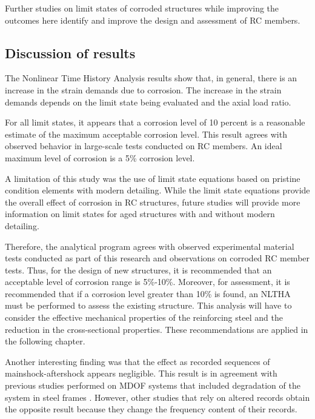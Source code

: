 Further studies on limit states of corroded structures while improving the outcomes here identify and improve the design and assessment of RC members.

\subsection{Discussion of results}

The Nonlinear Time History Analysis results show that, in general, there is an increase in the strain demands due to corrosion. The increase in the strain demands depends on the limit state being evaluated and the axial load ratio. 

For all limit states, it appears that a corrosion level of 10 percent is a reasonable estimate of the maximum acceptable corrosion level. This result agrees with observed behavior in large-scale tests conducted on RC members. An ideal maximum level of corrosion is a 5\% corrosion level.

A limitation of this study was the use of limit state equations based on pristine condition elements with modern detailing. While the limit state equations provide the overall effect of corrosion in RC structures, future studies will provide more information on limit states for aged structures with and without modern detailing.

Therefore, the analytical program agrees with observed experimental material tests conducted as part of this research and observations on corroded RC member tests. Thus, for the design of new structures, it is recommended that an acceptable level of corrosion range is 5\%-10\%. Moreover, for assessment, it is recommended that if a corrosion level greater than 10\% is found, an NLTHA must be performed to assess the existing structure. This analysis will have to consider the effective mechanical properties of the reinforcing steel and the reduction in the cross-sectional properties. These recommendations are applied in the following chapter. 

Another interesting finding was that the effect as recorded sequences of mainshock-aftershock appears negligible. This result is in agreement with previous studies performed on MDOF systems that included degradation of the system in steel frames \cite{Ruiz-Garcia2011}. However, other studies that rely on altered records obtain the opposite result because they change the frequency content of their records.